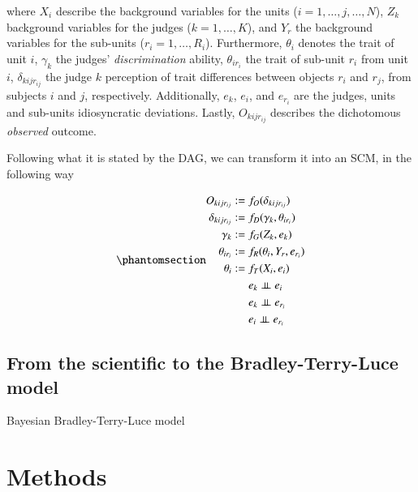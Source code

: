 \documentclass[
  12pt]{article}
\begin{document}
where \(X_{i}\) describe the background variables for the units
(\(i = 1, \dots, j, \dots, N\)), \(Z_{k}\) background variables for the
judges (\(k = 1, \dots, K\)), and \(Y_{r}\) the background variables for
the sub-units (\(r_{i} = 1, \dots, R_{i}\)). Furthermore, \(\theta_{i}\)
denotes the trait of unit \(i\), \(\gamma_{k}\) the judges'
\emph{discrimination} ability, \(\theta_{ir_{i}}\) the trait of sub-unit
\(r_{i}\) from unit \(i\), \(\delta_{kijr_{ij}}\) the judge \(k\)
perception of trait differences between objects \(r_{i}\) and \(r_{j}\),
from subjects \(i\) and \(j\), respectively. Additionally, \(e_{k}\),
\(e_{i}\), and \(e_{r_{i}}\) are the judges, units and sub-units
idiosyncratic deviations. Lastly, \(O_{kijr_{ij}}\) describes the
dichotomous \emph{observed} outcome.

Following what it is stated by the DAG, we can transform it into an SCM,
in the following way

\begin{equation}\phantomsection\label{eq-StructuralModel}{
\begin{aligned}
  O_{kijr_{ij}} := & \; f_{O}( \delta_{kijr_{ij}} ) \\
  \delta_{kijr_{ij}} := & \; f_{D}( \gamma_{k}, \theta_{ir_{i}} ) \\
  \gamma_{k} := & \; f_{G}( Z_{k}, e_{k} ) \\
  \theta_{ir_{i}} := & \; f_{R}( \theta_{i}, Y_{r}, e_{r_{i}} ) \\
  \theta_{i} := & \; f_{T}( X_{i}, e_{i} ) \\
  & \; e_{k} \perp\kern-5pt\perp e_{i} \\
  & \; e_{k} \perp\kern-5pt\perp e_{r_{i}} \\
  & \; e_{i} \perp\kern-5pt\perp e_{r_{i}}
\end{aligned}
}\end{equation}

\subsection{From the scientific to the Bradley-Terry-Luce
model}\label{sec-Sci2StatMod}

Bayesian Bradley-Terry-Luce model \citep[BTL
model,][]{Bradley_et_al_1952, Luce_1959, Pollitt_2012b}

\section{Methods}\label{sec-methods}
\end{document}
